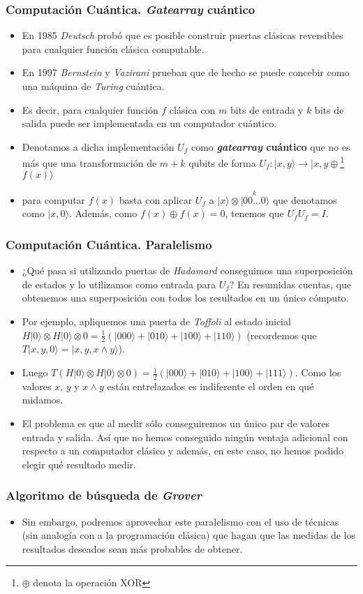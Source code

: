 \documentclass{beamer}
\newcommand{\base}[1]{|#1\rangle}
\begin{document}
\begin{frame}
	\frametitle{Computación Cuántica. \textit{Gatearray} cuántico}
	\begin{itemize}
	\item En 1985 \textit{Deutsch} probó que es posible construir puertas clásicas reversibles para cualquier función clásica computable.
	\item En 1997 \textit{Bernstein} y \textit{Vazirani} prueban que de hecho se puede concebir como una máquina de \textit{Turing} cuántica.
	\item Es decir, para cualquier función $f$ clásica con $m$ bits de entrada y $k$ bits de salida puede ser implementada en un computador cuántico.
	\item Denotamos a dicha implementación $U_f$ como \textbf{\textit{gatearray} cuántico} que no es más que una transformación de $m+k$ qubits de forma $U_f:\base{x,y}\to\base{x,y\oplus$\footnote{$\oplus$ denota la operación XOR}$f(x)}$
	\item para computar $f(x)$ basta con aplicar $U_f$ a $\base{x}\otimes\base{\overset{k}{00\hdots0}}$ que denotamos como $\base{x,0}$. Además, como $f(x)\oplus f(x) = 0$, tenemos que $U_fU_f=I$.
	\end{itemize}
\end{frame}

\begin{frame}
	\frametitle{Computación Cuántica. Paralelismo}
	\begin{itemize}
	\item ¿Qué pasa si utilizando puertas de \textit{Hadamard} conseguimos una superposición de estados y lo utilizamos como entrada para $U_f$? En resumidas cuentas, que obtenemos una superposición con todos los resultados en un único cómputo.
	\item Por ejemplo, apliquemos una puerta de \textit{Toffoli} al estado inicial $H\base0\otimes H\base0\otimes 0 = \frac{1}{2}(\base{000}+\base{010}+\base{100}+\base{110})$ (recordemos que $T\base{x,y,0}=\base{x,y,x\land y}$).
	\item Luego $T(H\base0\otimes H\base0\otimes 0)=\frac{1}{2}(\base{000}+\base{010}+\base{100}+\base{111})$. Como los valores $x$, $y$ y $x\land y$ están entrelazados es indiferente el orden en qué midamos.
	\item El problema es que al medir sólo conseguiremos un único par de valores entrada y salida. Así que no hemos conseguido ningún ventaja adicional con respecto a un computador clásico y además, en este caso, no hemos podido elegir qué resultado medir.
	\end{itemize}
\end{frame}

\begin{frame}
	\frametitle{Algoritmo de búsqueda de \textit{Grover}}
	\begin{itemize}
	\item Sin embargo, podremos aprovechar este paralelismo con el uso de técnicas (sin analogía con a la programación clásica) que hagan que las medidas de los resultados deseados sean más probables de obtener.
	\end{itemize}
\end{frame}
\end{document}
